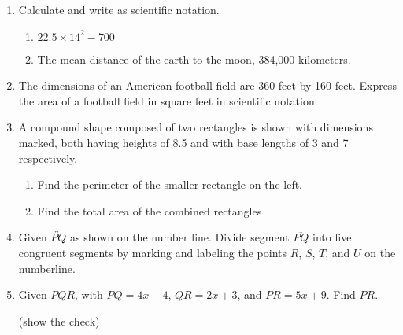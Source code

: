 \begin{enumerate}
\item Calculate and write as scientific notation.
  \begin{multicols}{2}
    \begin{enumerate}[itemsep=1cm]
      \item $22.5 \times 14^2-700$
      \item The mean distance of the earth to the moon, 384,000 kilometers.
    \end{enumerate}
  \end{multicols} \vspace{1cm}

\item The dimensions of an American football field are 360 feet by 160 feet. Express the area of a football field in square feet in scientific notation.

\newpage
\item A compound shape composed of two rectangles is shown with dimensions marked, both having heights of 8.5 and with base lengths of 3 and 7 respectively.
\begin{multicols}{2}
  \begin{enumerate}
    \item Find the perimeter of the smaller rectangle on the left. \vspace{2cm}
    \item Find the total area of the combined rectangles
    \end{enumerate}
  \end{multicols} \vspace{1cm}

\item Given $\overleftrightarrow{PQ}$ as shown on the number line. Divide segment $\overline{PQ}$ into five congruent segments by marking and labeling the points $R$, $S$, $T$, and $U$ on the numberline. \par \vspace{1cm}
   \vspace{1cm}

\item Given $\overline{PQR}$, with $PQ=4x-4$, $QR=2x+3$, and $PR=5x+9$. Find ${PR}$. \par (show the check)


\end{enumerate}
